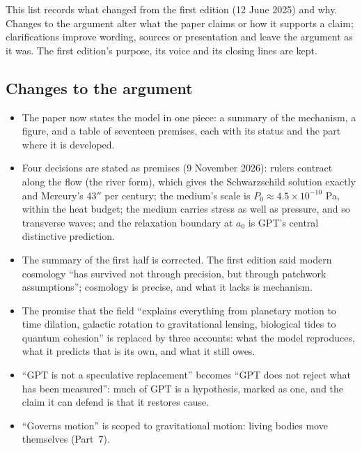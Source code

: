 \documentclass[11pt,a4paper]{article}
\begin{document}
This list records what changed from the first edition (12 June 2025) and why. Changes to the argument alter what the paper claims or how it supports a claim; clarifications improve wording, sources or presentation and leave the argument as it was. The first edition's purpose, its voice and its closing lines are kept.

\subsection*{Changes to the argument}
\begin{itemize}
\item The paper now states the model in one piece: a summary of the mechanism, a figure, and a table of seventeen premises, each with its status and the part where it is developed.
\item Four decisions are stated as premises (9 November 2026): rulers contract along the flow (the river form), which gives the Schwarzschild solution exactly and Mercury's 43$''$ per century; the medium's scale is $P_0 \approx 4.5\times10^{-10}$ Pa, within the heat budget; the medium carries stress as well as pressure, and so transverse waves; and the relaxation boundary at $a_0$ is GPT's central distinctive prediction.
\item The summary of the first half is corrected. The first edition said modern cosmology ``has survived not through precision, but through patchwork assumptions''; cosmology is precise, and what it lacks is mechanism.
\item The promise that the field ``explains everything from planetary motion to time dilation, galactic rotation to gravitational lensing, biological tides to quantum cohesion'' is replaced by three accounts: what the model reproduces, what it predicts that is its own, and what it still owes.
\item ``GPT is not a speculative replacement'' becomes ``GPT does not reject what has been measured'': much of GPT is a hypothesis, marked as one, and the claim it can defend is that it restores cause.
\item ``Governs motion'' is scoped to gravitational motion: living bodies move themselves (Part~7).
\end{itemize}
\end{document}
